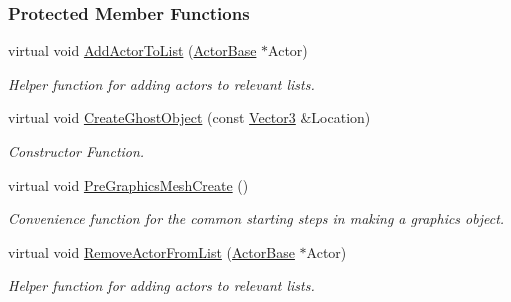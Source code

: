 \subsubsection*{Protected Member Functions}
\begin{DoxyCompactItemize}
\item 
\hypertarget{classphys_1_1AreaEffect_a7af039b84f8d55e2c1c2d5a1b57afd8a}{
virtual void \hyperlink{classphys_1_1AreaEffect_a7af039b84f8d55e2c1c2d5a1b57afd8a}{AddActorToList} (\hyperlink{classphys_1_1ActorBase}{ActorBase} $\ast$Actor)}
\label{classphys_1_1AreaEffect_a7af039b84f8d55e2c1c2d5a1b57afd8a}

\begin{DoxyCompactList}\small\item\em Helper function for adding actors to relevant lists. \item\end{DoxyCompactList}\item 
virtual void \hyperlink{classphys_1_1AreaEffect_a6c31aa396851e4e17de53d9e83e2f8ee}{CreateGhostObject} (const \hyperlink{classphys_1_1Vector3}{Vector3} \&Location)
\begin{DoxyCompactList}\small\item\em Constructor Function. \item\end{DoxyCompactList}\item 
\hypertarget{classphys_1_1AreaEffect_a923efe92684ce71e138ad182b356b9c0}{
virtual void \hyperlink{classphys_1_1AreaEffect_a923efe92684ce71e138ad182b356b9c0}{PreGraphicsMeshCreate} ()}
\label{classphys_1_1AreaEffect_a923efe92684ce71e138ad182b356b9c0}

\begin{DoxyCompactList}\small\item\em Convenience function for the common starting steps in making a graphics object. \item\end{DoxyCompactList}\item 
\hypertarget{classphys_1_1AreaEffect_a98bf156da3c7f8bb98d5ce9d37b6aa0f}{
virtual void \hyperlink{classphys_1_1AreaEffect_a98bf156da3c7f8bb98d5ce9d37b6aa0f}{RemoveActorFromList} (\hyperlink{classphys_1_1ActorBase}{ActorBase} $\ast$Actor)}
\label{classphys_1_1AreaEffect_a98bf156da3c7f8bb98d5ce9d37b6aa0f}

\begin{DoxyCompactList}\small\item\em Helper function for adding actors to relevant lists. \item\end{DoxyCompactList}\end{DoxyCompactItemize}

